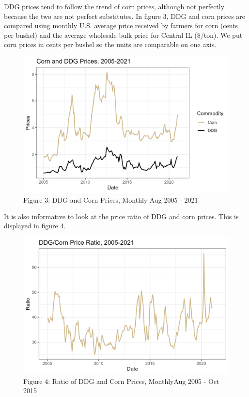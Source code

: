 \documentclass[
  letterpaper,
  DIV=11,
  numbers=noendperiod]{scrreprt}
\begin{document}
DDG prices tend to follow the trend of corn prices, although not
perfectly because the two are not perfect substitutes. In figure 3, DDG
and corn prices are compared using monthly U.S. average price received
by farmers for corn (cents per bushel) and the average wholesale bulk
price for Central IL (\$/ton). We put corn prices in cents per bushel so
the units are comparable on one axis.

\begin{figure}

{\centering \includegraphics{assets/CornDDGPrices.png}

}

\caption{Figure 3: DDG and Corn Prices, Monthly Aug 2005 - 2021}

\end{figure}

It is also informative to look at the price ratio of DDG and corn
prices. This is displayed in figure 4.

\begin{figure}

{\centering \includegraphics{assets/DDGCORNRatio.png}

}

\caption{Figure 4: Ratio of DDG and Corn Prices, MonthlyAug 2005 - Oct
2015}

\end{figure}
\end{document}
